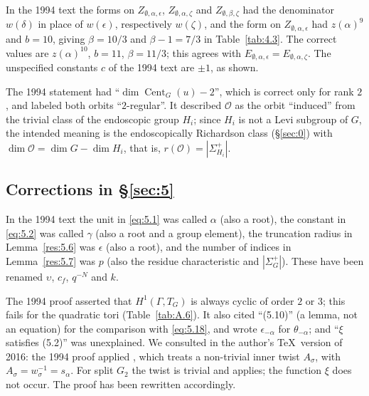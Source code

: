 \documentclass[12pt,letterpaper]{amsart}
\theoremstyle{plain}
\theoremstyle{definition}
\theoremstyle{remark}
\theoremstyle{definition}
\DeclareMathOperator{\Cent}{Cent}
\begin{document}
\begin{rem26}\label{rem:4.forms}
In the 1994 text the forms on $Z_{\emptyset,\alpha,\epsilon}$,
$Z_{\emptyset,\alpha,\zeta}$ and $Z_{\emptyset,\beta,\zeta}$ had the
denominator $w(\delta)$ in place of $w(\epsilon)$, respectively $w(\zeta)$,
and the form on $Z_{\emptyset,\alpha,\epsilon}$ had $z(\alpha)^9$ and $b=10$,
giving $\beta=10/3$ and $\beta-1=7/3$ in Table~\ref{tab:4.3}. The correct
values are $z(\alpha)^{10}$, $b=11$, $\beta=11/3$; this agrees with
$E_{\emptyset,\alpha,\epsilon}=E_{\emptyset,\alpha,\zeta}$. The
unspecified constants $c$ of the 1994 text are $\pm1$, as shown.
\end{rem26}

\begin{rem26}\label{rem:4.4}
The 1994 statement had ``$\dim\Cent_G(u)-2$'', which is correct only for
rank $2$, and labeled both orbits ``$2$-regular''. It described
$\mathcal O$ as the orbit ``induced'' from the trivial class of the
endoscopic group $H_i$; since $H_i$ is not a Levi subgroup of $G$, the
intended meaning is the endoscopically Richardson class (\S\ref{sec:0}) with
$\dim\mathcal O=\dim G-\dim H_i$, that is, $r(\mathcal O)=|\Sigma_{H_i}^+|$.
\end{rem26}

\subsection*{Corrections in \S\ref{sec:5}}

\begin{rem26}\label{rem:5.notation}
In the 1994 text the unit in \eqref{eq:5.1} was called $\alpha$ (also a root),
the constant in \eqref{eq:5.2} was called $\gamma$ (also a root and a group
element), the truncation radius in Lemma~\ref{res:5.6} was $\epsilon$ (also a
root), and the number of indices in Lemma~\ref{res:5.7} was $p$ (also the
residue characteristic and $|\Sigma^+_G|$). These have been renamed
$\upsilon$, $c_f$, $q^{-N}$ and $k$.
\end{rem26}

\begin{rem26}\label{rem:5.17}
The 1994 proof asserted that $H^1(\Gamma,T_G)$ is always cyclic of order
$2$ or $3$; this fails for the quadratic tori (Table~\ref{tab:A.6}). It also
cited ``(5.10)'' (a lemma, not an equation) for the comparison with
\eqref{eq:5.18}, and wrote $\epsilon_{-\alpha}$ for $\theta_{-\alpha}$; and
``$\xi$ satisfies (5.2)'' was unexplained. We consulted \cite{Ha92a}
in the author's \TeX\ version of 2016: the 1994 proof applied \cite[Ch.~I,
Cor.~5.7]{Ha92a}, which treats a non-trivial inner twist $A_\sigma$, with
$A_\sigma=w_\sigma^{-1}=s_\alpha$. For split $G_2$ the twist is trivial and
\cite[Ch.~I, Cor.~5.4]{Ha92a} applies; the function $\xi$ does not occur.
The proof has been rewritten accordingly.
\end{rem26}
\end{document}
